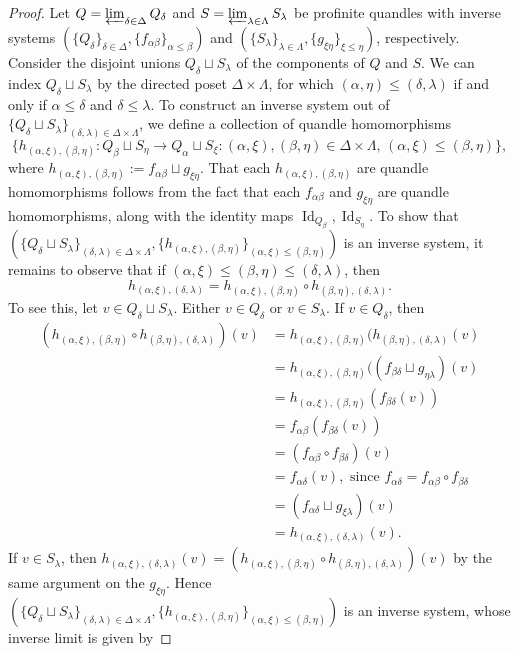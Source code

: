 \documentclass[reqno,dvipsnames]{amsart}
\renewcommand{\d}{\delta}
\renewcommand{\a}{\alpha}
\renewcommand{\b}{\beta}
\DeclareMathOperator*{\Id}{Id}                       %
\theoremstyle{definition}
\begin{document}
{\begin{proof}
Let $Q=\varprojlim_{\d\in\Delta}Q_\d$ and $S=\varprojlim_{\lambda\in\Lambda}S_\lambda$ be profinite quandles with inverse systems $(\{Q_\d\}_{\d\in\Delta},\{f_{\a\b}\}_{\a\leq\b})$ and $(\{S_\lambda\}_{\lambda\in\Lambda},\{g_{\xi\eta}\}_{\xi\leq\eta})$, respectively. Consider the disjoint unions $Q_\d\sqcup S_\lambda$ of the components of $Q$ and $S$. We can index $Q_\d\sqcup S_\lambda$ by the directed poset $\Delta\times\Lambda$, for which $(\a,\eta)\leq(\d,\lambda)$ if and only if $\a\leq\d$ and $\d\leq\lambda$. To construct an inverse system out of $\{Q_\d\sqcup S_\lambda\}_{(\d,\lambda)\in\Delta\times\Lambda}$, we define a collection of quandle homomorphisms
\[\{h_{(\a,\xi),(\b,\eta)}:Q_\b\sqcup S_\eta\to Q_\a\sqcup S_\xi:(\a,\xi),(\b,\eta)\in\Delta\times\Lambda,\,(\a,\xi)\leq(\b,\eta)\},\]
where $h_{(\a,\xi),(\b,\eta)}:=f_{\a\b}\sqcup g_{\xi\eta}$. That each $h_{(\a,\xi),(\b,\eta)}$ are quandle homomorphisms follows from the fact that each $f_{\a\b}$ and $g_{\xi\eta}$ are quandle homomorphisms, along with the identity maps $\Id_{Q_\b},\Id_{S_\eta}$. To show that $(\{Q_\d\sqcup S_\lambda\}_{(\d,\lambda)\in\Delta\times\Lambda},\{h_{(\a,\xi),(\b,\eta)}\}_{(\a,\xi)\leq(\b,\eta)})$ is an inverse system, it remains to observe that if $(\a,\xi)\leq(\b,\eta)\leq(\d,\lambda)$, then
\[h_{(\a,\xi),(\d,\lambda)}=h_{(\a,\xi),(\b,\eta)}\circ h_{(\b,\eta),(\d,\lambda)}.\]
To see this, let $v\in Q_\d\sqcup S_\lambda$. Either $v\in Q_\d$ or $v\in S_\lambda$. If $v\in Q_\d$, then
\begin{align*}
(h_{(\a,\xi),(\b,\eta)}\circ h_{(\b,\eta),(\d,\lambda)})(v)
&=h_{(\a,\xi),(\b,\eta)}(h_{(\b,\eta),(\d,\lambda)}(v)\\
&=h_{(\a,\xi),(\b,\eta)}((f_{\b\d}\sqcup g_{\eta\lambda})(v)\\
&=h_{(\a,\xi),(\b,\eta)}(f_{\b\d}(v))\\
&=f_{\a\b}(f_{\b\d}(v))\\
&=(f_{\a\b}\circ f_{\b\d})(v)\\
&=f_{\a\d}(v),\text{ since }f_{\a\d}=f_{\a\b}\circ f_{\b\d}\\
&=(f_{\a\d}\sqcup g_{\xi\lambda})(v)\\
&=h_{(\a,\xi),(\d,\lambda)}(v).
\end{align*}
If $v\in S_\lambda$, then $h_{(\a,\xi),(\d,\lambda)}(v)=(h_{(\a,\xi),(\b,\eta)}\circ h_{(\b,\eta),(\d,\lambda)})(v)$ by the same argument on the $g_{\xi\eta}$. Hence $(\{Q_\d\sqcup S_\lambda\}_{(\d,\lambda)\in\Delta\times\Lambda},\{h_{(\a,\xi),(\b,\eta)}\}_{(\a,\xi)\leq(\b,\eta)})$ is an inverse system, whose inverse limit is given by

\end{proof}}
\end{document}
